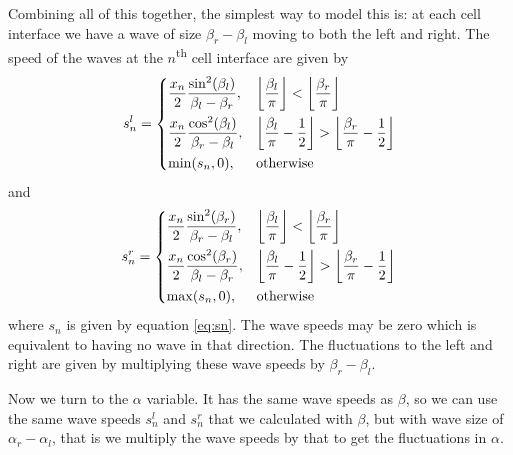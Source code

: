 \documentclass[12pt]{article}
\begin{document}
Combining all of this together, the simplest way to model this is: at each cell
interface we have a wave of size $\beta_r - \beta_l$ moving to both the left and right.
The speed of the waves at the $n$\textsuperscript{th} cell interface are given by
\[ s_n^l = \begin{dcases}
    \frac{x_n}{2} \frac{\sin^2(\beta_l)}{\beta_l - \beta_r}, & \left\lfloor
    \frac{\beta_l}{\pi} \right\rfloor < \left\lfloor \frac{\beta_r}{\pi} \right\rfloor
    \\
    \frac{x_n}{2} \frac{\cos^2(\beta_l)}{\beta_r - \beta_l}, & \left\lfloor
    \frac{\beta_l}{\pi} - \frac{1}{2} \right\rfloor  > \left\lfloor
    \frac{\beta_r}{\pi} - \frac{1}{2} \right\rfloor \\
    \min(s_n, 0), & \textrm{otherwise}
\end{dcases} \]
and
\[ s_n^r = \begin{dcases}
    \frac{x_n}{2} \frac{\sin^2(\beta_r)}{\beta_r - \beta_l}, & \left\lfloor
    \frac{\beta_l}{\pi} \right\rfloor < \left\lfloor \frac{\beta_r}{\pi} \right\rfloor
    \\
    \frac{x_n}{2} \frac{\cos^2(\beta_r)}{\beta_l - \beta_r}, & \left\lfloor
    \frac{\beta_l}{\pi} - \frac{1}{2} \right\rfloor  > \left\lfloor
    \frac{\beta_r}{\pi} - \frac{1}{2} \right\rfloor \\
    \max(s_n, 0), & \textrm{otherwise}
\end{dcases} \]
where $s_n$ is given by equation \ref{eq:sn}. The wave speeds may be zero which is
equivalent to having no wave in that direction. The fluctuations to the left and right
are given by multiplying these wave speeds by $\beta_r - \beta_l$.

Now we turn to the $\alpha$ variable. It has the same wave speeds as $\beta$, so we can
use the same wave speeds $s_n^l$ and $s_n^r$ that we calculated with $\beta$, but with
wave size of $\alpha_r - \alpha_l$, that is we multiply the wave speeds by that to get
the fluctuations in $\alpha$.
\end{document}

